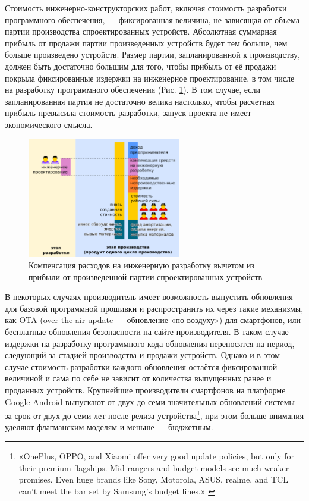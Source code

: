\documentclass{article}
\begin{document}
Стоимость инженерно-конструкторских работ, включая стоимость разработки программного обеспечения, — фиксированная величина, не зависящая от объема партии производства спроектированных устройств. Абсолютная суммарная прибыль от продажи партии произведенных устройств будет тем больше, чем больше произведено устройств. Размер партии, запланированной к производству, должен быть достаточно большим для того, чтобы прибыль от её продажи покрыла фиксированные издержки на инженерное проектирование, в том числе на разработку программного обеспечения (Рис. \ref{fig:model_hard_soft}). В том случае, если запланированная партия не достаточно велика настолько, чтобы расчетная прибыль превысила стоимость разработки, запуск проекта не имеет экономического смысла.

\begin{figure}[h]
    \centering
    \includegraphics[width=0.60\textwidth]{model-hard-soft}
    \caption{Компенсация расходов на инженерную разработку вычетом из прибыли от произведенной партии спроектированных устройств}
    \label{fig:model_hard_soft}
\end{figure}

В некоторых случаях производитель имеет возможность выпустить обновления для базовой программной прошивки и распространить их через такие механизмы, как OTA (over the air update — обновление «по воздуху») для смартфонов, или бесплатные обновления безопасности на сайте производителя. В таком случае издержки на разработку программного кода обновления переносятся на период, следующий за стадией производства и продажи устройств. Однако и в этом случае стоимость разработки каждого обновления остаётся фиксированной величиной и сама по себе не зависит от количества выпущенных ранее и проданных устройств. Крупнейшие производители смартфонов на платформе Google Android выпускают от двух до семи значительных обновлений системы за срок от двух до семи лет после релиза устройства\footnote{«OnePlus, OPPO, and Xiaomi offer very good update policies, but only for their premium flagships. Mid-rangers and budget models see much weaker promises. Even huge brands like Sony, Motorola, ASUS, realme, and TCL can’t meet the bar set by Samsung’s budget lines.» \cite{phoneUpdates}}, при этом больше внимания уделяют флагманским моделям и меньше — бюджетным.
\end{document}
